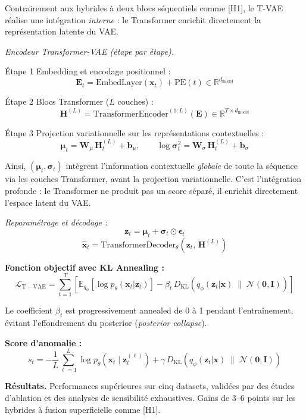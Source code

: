 \documentclass[12pt,a4paper]{article}
\begin{document}
Contrairement aux hybrides à deux blocs séquentiels comme [H1], le T-VAE réalise une intégration \textit{interne} : le Transformer enrichit directement la représentation latente du VAE.

\textit{Encodeur Transformer-VAE (étape par étape).}

Étape 1  Embedding et encodage positionnel :
$$\mathbf{E}_t = \mathrm{EmbedLayer}(\mathbf{x}_t) + \mathrm{PE}(t) \in \mathbb{R}^{d_{\mathrm{model}}}$$

Étape 2  Blocs Transformer ($L$ couches) :
$$\mathbf{H}^{(L)} = \mathrm{TransformerEncoder}^{(1:L)}(\mathbf{E}) \in \mathbb{R}^{T \times d_{\mathrm{model}}}$$

Étape 3  Projection variationnelle sur les représentations contextuelles :
$$\boldsymbol{\mu}_t = \mathbf{W}_\mu\,\mathbf{H}^{(L)}_t + \mathbf{b}_\mu, \qquad \log\boldsymbol{\sigma}^2_t = \mathbf{W}_\sigma\,\mathbf{H}^{(L)}_t + \mathbf{b}_\sigma$$

Ainsi, $(\boldsymbol{\mu}_t, \boldsymbol{\sigma}_t)$ intègrent l'information contextuelle \textit{globale} de toute la séquence via les couches Transformer, avant la projection variationnelle. C'est l'intégration profonde : le Transformer ne produit pas un score séparé, il enrichit directement l'espace latent du VAE.

\textit{Reparamétrage et décodage :}
$$\mathbf{z}_t = \boldsymbol{\mu}_t + \boldsymbol{\sigma}_t \odot \boldsymbol{\epsilon}_t$$
$$\hat{\mathbf{x}}_t = \mathrm{TransformerDecoder}_\theta(\mathbf{z}_t,\,\mathbf{H}^{(L)})$$

\textbf{Fonction objectif avec KL Annealing :}
$$\mathcal{L}_{\mathrm{T-VAE}} = \sum_{t=1}^T\left[\mathbb{E}_{q_\phi}\!\left[\log p_\theta(\mathbf{x}_t|\mathbf{z}_t)\right] - \beta_t\,D_{\mathrm{KL}}\!\left(q_\phi(\mathbf{z}_t|\mathbf{x}) \;\|\; \mathcal{N}(\mathbf{0},\mathbf{I})\right)\right]$$

Le coefficient $\beta_t$ est progressivement annealed de 0 à 1 pendant l'entraînement, évitant l'effondrement du posterior (\textit{posterior collapse}).

\textbf{Score d'anomalie :}
$$s_t = -\frac{1}{L}\sum_{\ell=1}^L\log p_\theta\!\left(\mathbf{x}_t\mid\mathbf{z}^{(\ell)}_t\right) + \gamma\,D_{\mathrm{KL}}(q_\phi(\mathbf{z}_t|\mathbf{x})\;\|\;\mathcal{N}(\mathbf{0},\mathbf{I}))$$

\textbf{Résultats.} Performances supérieures sur cinq datasets, validées par des études d'ablation et des analyses de sensibilité exhaustives. Gains de 3--6 points sur les hybrides à fusion superficielle comme [H1].
\end{document}
